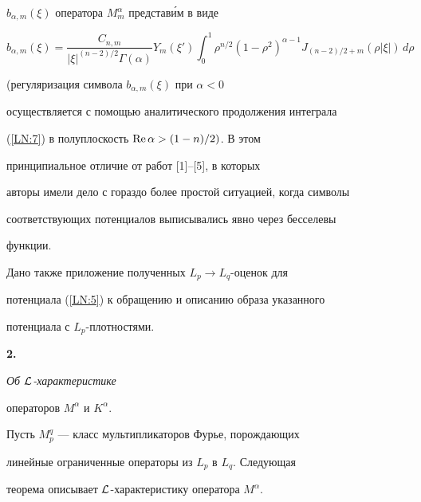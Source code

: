 $b_{\alpha,m}(\xi)$ оператора $M_m^\alpha$ представ\'им в виде


\begin{equation}\label{LN:7}


b_{\alpha,m}(\xi)= \frac{C_{n,m}}{|\xi|^{(n-2)/2}


\Gamma(\alpha)} Y_m(\xi') \int_0^1 \rho^{n/2}


(1-\rho^2)^{\alpha-1} J_{(n-2)/2+m} (\rho|\xi|)\,d\rho


\end{equation}


(регуляризация символа $b_{\alpha,m}(\xi)$ при $\alpha<0$


осуществляется с помощью аналитического продолжения интеграла


(\ref{LN:7}) в полуплоскость $\text{Re\,}\alpha>(1-n)/2)$. В этом


принципиальное отличие от работ [1]--[5], в которых


авторы имели дело с гораздо более простой ситуацией, когда символы


соответствующих потенциалов выписывались явно через бесселевы


функции.





Дано также приложение полученных $L_p\to L_q$-оценок для


потенциала (\ref{LN:5}) к обращению и описанию образа указанного


потенциала с $L_p$-плотностями.


\medskip





{\bf 2.} {\it Об $\cal L$-характеристике


операторов $M^\alpha$ и $K^\alpha$.}


Пусть $M_p^q$ --- класс мультипликаторов Фурье, порождающих


линейные ограниченные операторы из $L_p$ в $L_q$. Следующая


теорема описывает $\cal L$-характеристику оператора $M^\alpha$.





